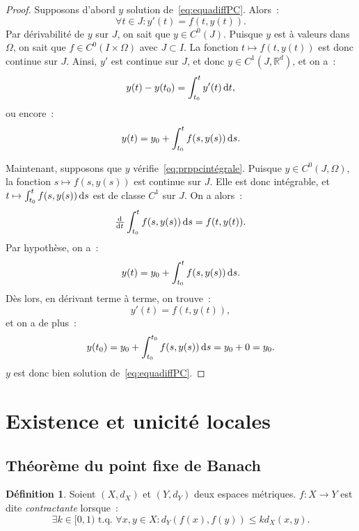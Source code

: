 \documentclass{report}
\theoremstyle{definition}
\newtheorem{déf}[thm]{Définition}
\theoremstyle{remark}
\numberwithin{equation}{section}
\newcommand{\R}{\mathbb R}
\newcommand{\tq}{\text{ t.q. }}
\begin{document}
			\begin{proof} Supposons d'abord $y$ solution de~\eqref{eq:equadiffPC}. Alors~:
			\begin{equation}
				\forall t \in J : y'(t) = f(t, y(t)).
			\end{equation}
			Par dérivabilité de $y$ sur $J$, on sait que $y \in C^0(J)$. Puisque $y$ est à valeurs dans $\Omega$, on sait que $f \in C^0(I \times \Omega)$ avec
			$J \subset I$. La fonction $t \mapsto f(t, y(t))$ est donc continue sur $J$. Ainsi, $y'$ est continue sur $J$, et donc $y \in C^1(J, \R^d)$, et on a~:
			\begin{equation}
				y(t) - y(t_0) = \int_{t_0}^ty'(t)\dif t,
			\end{equation}
			ou encore~:
			\begin{equation}
				y(t) = y_0 + \int_{t_0}^t f(s, y(s))\dif s.
			\end{equation}

			Maintenant, supposons que $y$ vérifie~\eqref{eq:prppcintégrale}. Puisque $y \in C^0(J, \Omega)$, la fonction $s \mapsto f(s, y(s))$ est continue
			sur $J$. Elle est donc intégrable, et $t \mapsto \int_{t_0}^t f(s, y(s))\dif s$ est de classe $C^1$ sur $J$. On a alors~:
			\begin{equation}
				\od {}t\int_{t_0}^tf(s, y(s))\dif s = f(t, y(t)).
			\end{equation}
			Par hypothèse, on a~:
			\begin{equation}
				y(t) = y_0 + \int_{t_0}^tf(s, y(s))\dif s.
			\end{equation}
			Dès lors, en dérivant terme à terme, on trouve~:
			\begin{equation}
				y'(t) = f(t, y(t)),
			\end{equation}
			et on a de plus~:
			\begin{equation}
				y(t_0) = y_0 + \int_{t_0}^{t_0}f(s, y(s))\dif s = y_0 + 0 = y_0.
			\end{equation}
			$y$ est donc bien solution de~\eqref{eq:equadiffPC}.
			\end{proof}

	\section{Existence et unicité locales}
		\subsection{Théorème du point fixe de Banach}
			\begin{déf} Soient $(X, d_X)$ et $(Y, d_Y)$ deux espaces métriques. $f : X \to Y$ est dite \textit{contractante} lorsque~:
			\begin{equation}
				\exists k \in [0, 1) \tq \forall x, y \in X : d_Y(f(x), f(y)) \leq kd_X(x, y).
			\end{equation}
			\end{déf}
\end{document}
